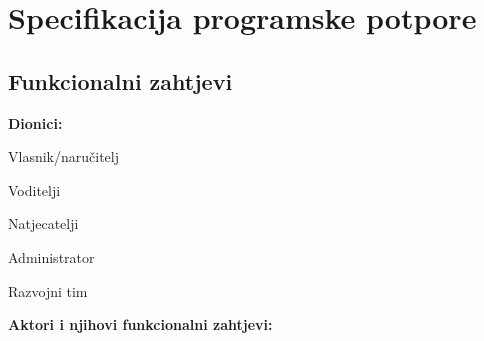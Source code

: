\chapter{Specifikacija programske potpore}
		
	\section{Funkcionalni zahtjevi}
			
			\noindent \textbf{Dionici:}
			
			\begin{packed_enum}
				
				\item Vlasnik/naručitelj
				\item Voditelji
				\item Natjecatelji				
				\item Administrator
				\item Razvojni tim
				
			\end{packed_enum}
			
			\noindent \textbf{Aktori i njihovi funkcionalni zahtjevi:}
			
